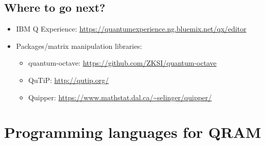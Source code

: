 \documentclass{beamer}
\begin{document}
\subsection{Where to go next?}
\begin{frame}{\insertsection}{\insertsubsection}
    \begin{itemize}
    \item IBM Q Experience: 
    {\small\url{https://quantumexperience.ng.bluemix.net/qx/editor}}
    \item Packages/matrix manipulation libraries:
    \begin{itemize}
        \item quantum-octave: 
        {\small \url{https://github.com/ZKSI/quantum-octave}}
        \item QuTiP: {\small\url{http://qutip.org/}}
        \item Quipper: 
        {\small\url{https://www.mathstat.dal.ca/~selinger/quipper/}}
    \end{itemize}
    \end{itemize}
\end{frame}

\section{Programming languages for QRAM}

\begin{frame}
    \begin{center}
    {\color{iitis-orange} \LARGE \insertsection}
    \end{center}
\end{frame}


\end{document}
